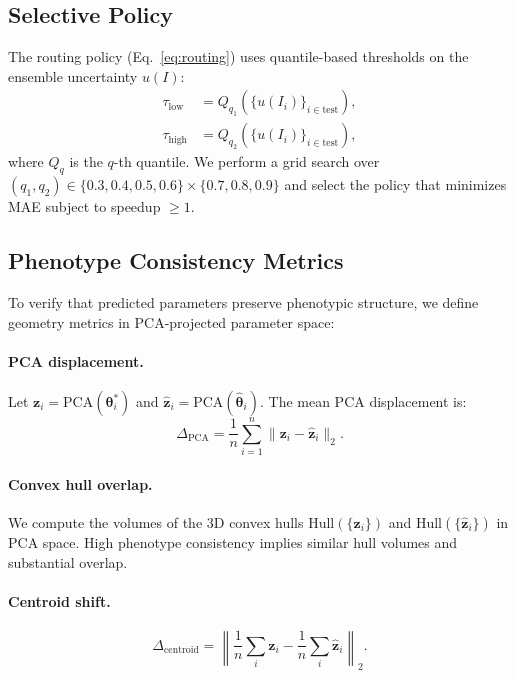 \documentclass[11pt,a4paper]{article}
\newcommand{\btheta}{\boldsymbol{\theta}}
\begin{document}
\subsection{Selective Policy}
\label{sec:policy}

The routing policy (Eq.~\ref{eq:routing}) uses quantile-based thresholds
on the ensemble uncertainty $u(I)$:
\begin{align}
\tau_\text{low} &= Q_{q_1}(\{u(I_i)\}_{i \in \text{test}}), \\
\tau_\text{high} &= Q_{q_2}(\{u(I_i)\}_{i \in \text{test}}),
\end{align}
where $Q_q$ is the $q$-th quantile. We perform a grid search over
$(q_1, q_2) \in \{0.3, 0.4, 0.5, 0.6\} \times \{0.7, 0.8, 0.9\}$
and select the policy that minimizes MAE subject to speedup $\geq 1$.

\subsection{Phenotype Consistency Metrics}

To verify that predicted parameters preserve phenotypic structure,
we define geometry metrics in PCA-projected parameter space:

\paragraph{PCA displacement.}
Let $\mathbf{z}_i = \text{PCA}(\btheta^*_i)$ and
$\hat{\mathbf{z}}_i = \text{PCA}(\hat{\btheta}_i)$. The mean
PCA displacement is:
\begin{equation}
\Delta_\text{PCA} = \frac{1}{n} \sum_{i=1}^{n}
\|\mathbf{z}_i - \hat{\mathbf{z}}_i\|_2.
\end{equation}

\paragraph{Convex hull overlap.}
We compute the volumes of the 3D convex hulls $\text{Hull}(\{\mathbf{z}_i\})$
and $\text{Hull}(\{\hat{\mathbf{z}}_i\})$ in PCA space.
High phenotype consistency implies similar hull volumes and substantial overlap.

\paragraph{Centroid shift.}
\begin{equation}
\Delta_\text{centroid} = \left\|\frac{1}{n}\sum_i \mathbf{z}_i -
\frac{1}{n}\sum_i \hat{\mathbf{z}}_i\right\|_2.
\end{equation}
\end{document}
